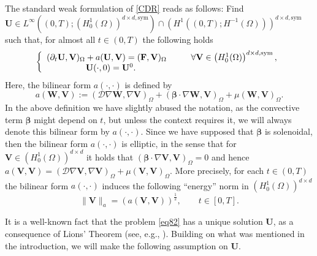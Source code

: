 \documentclass[final,12pt]{amsart}
\theoremstyle{plain}
\theoremstyle{definition}
\newcommand\bbeta{{\boldsymbol{\beta}}}
\begin{document}
The standard weak formulation of  \eqref{CDR} reads as follows: Find
$\mathbf{U}\in L^\infty((0,T);(H^1_0(\Omega))^{d\times d,\textrm{sym}})\cap\left( H^1((0,T);H^{-1}(\Omega))\right)^{d\times d,\textrm{sym}}$ such that, 
for almost all $t\in (0,T)$ the following holds
\begin{equation}
	\begin{split}
		\left\{ \begin{array}{ll}  
			(\partial_{t}\mathbf{U},\mathbf{V})_{\Omega} + a(\mathbf{U},\mathbf{V}) = (\mathbf{F},\mathbf{V})_{\Omega} \hspace{1cm} \forall \mathbf{V}\in 	\left(H^{1}_{0}(\Omega)\right)^{d\times d, \textrm{sym}},\\
			\hspace{1.6cm} \mathbf{U}(\cdot,0) = \mathbf{U}^{0}.
		\end{array} \right.\label{eq82}
	\end{split}
\end{equation}
Here, the bilinear form $a(\cdot,\cdot)$ is defined by
\begin{equation}
	a(\mathbf{W},\mathbf{V}):=\left(\mathcal{D}\nabla \mathbf{W},\nabla \mathbf{V}\right)_{\Omega}+(\bbeta\cdot\nabla \mathbf{W},\mathbf{V})_{\Omega}+\mu( \mathbf{W},\mathbf{V})_{\Omega}.\label{eq81}
\end{equation}
In the above definition we have slightly abused the notation, as the convective term $\bbeta$ might depend on $t$, but unless the context requires it, we will always denote
this bilinear form by $a(\cdot,\cdot)$.  Since we have supposed that $\bbeta$ is solenoidal, then the bilinear form $a(\cdot,\cdot)$ is elliptic, in the sense that for $\mathbf{V}\in (H^1_0(\Omega))^{d\times d}$ it holds that $(\bbeta\cdot\nabla\mathbf{V},\mathbf{V})_\Omega=0$ and hence $a(\mathbf{V},\mathbf{V})=(\mathcal{D}\nabla\mathbf{V},\nabla\mathbf{V})_\Omega+\mu(\mathbf{V},\mathbf{V})_\Omega$.
More precisely, for each $t\in (0,T)$ the 
bilinear form  $a(\cdot,\cdot)$ induces the following ``energy'' norm in $	\left(H^{1}_{0}(\Omega)\right)^{d\times d}$
\begin{equation*}
	\|\mathbf{V} \|_{a}=\left( a(\mathbf{V},\mathbf{V})\right)^{\frac{1}{2}},\qquad t\in [0,T].
\end{equation*}

It is a well-known fact that the problem \eqref{eq82} has a unique solution $\mathbf{U}$, as a consequence
of Lions' Theorem (see, e.g., \cite[Theorem~4.1]{lions2012non}).  Building on what was mentioned in the introduction, we will make the following assumption on  $\mathbf{U}$.
\end{document}
